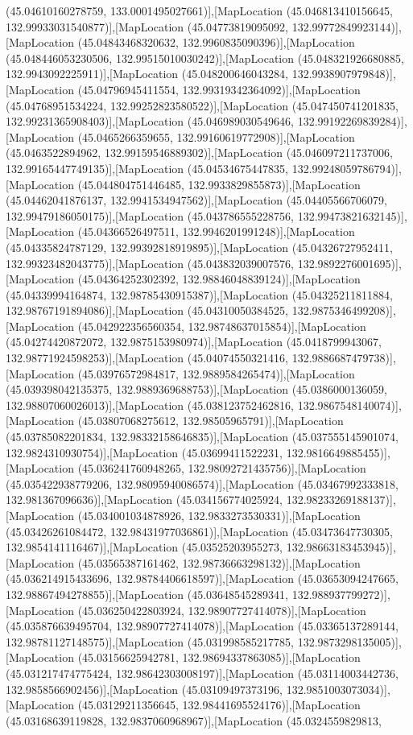 (45.04610160278759, 133.0001495027661)],[MapLocation (45.046813410156645, 132.99933031540877)],[MapLocation (45.04773819095092, 132.99772849923144)],[MapLocation (45.04843468320632, 132.9960835090396)],[MapLocation (45.048446053230506, 132.99515010030242)],[MapLocation (45.048321926680885, 132.9943092225911)],[MapLocation (45.048200646043284, 132.9938907979848)],[MapLocation (45.04796945411554, 132.99319342364092)],[MapLocation (45.04768951534224, 132.99252823580522)],[MapLocation (45.047450741201835, 132.99231365908403)],[MapLocation (45.046989030549646, 132.99192269839284)],[MapLocation (45.0465266359655, 132.99160619772908)],[MapLocation (45.0463522894962, 132.99159546889302)],[MapLocation (45.046097211737006, 132.99165447749135)],[MapLocation (45.04534675447835, 132.99248059786794)],[MapLocation (45.044804751446485, 132.9933829855873)],[MapLocation (45.04462041876137, 132.9941534947562)],[MapLocation (45.04405566706079, 132.99479186050175)],[MapLocation (45.043786555228756, 132.99473821632145)],[MapLocation (45.04366526497511, 132.9946201991248)],[MapLocation (45.04335824787129, 132.99392818919895)],[MapLocation (45.04326727952411, 132.99323482043775)],[MapLocation (45.043832039007576, 132.9892276001695)],[MapLocation (45.04364252302392, 132.98846048839124)],[MapLocation (45.04339994164874, 132.98785430915387)],[MapLocation (45.04325211811884, 132.98767191894086)],[MapLocation (45.04310050384525, 132.9875346499208)],[MapLocation (45.042922356560354, 132.98748637015854)],[MapLocation (45.04274420872072, 132.9875153980974)],[MapLocation (45.0418799943067, 132.98771924598253)],[MapLocation (45.04074550321416, 132.9886687479738)],[MapLocation (45.03976572984817, 132.9889584265474)],[MapLocation (45.039398042135375, 132.9889369688753)],[MapLocation (45.0386000136059, 132.98807060026013)],[MapLocation (45.038123752462816, 132.9867548140074)],[MapLocation (45.03807068275612, 132.98505965791)],[MapLocation (45.03785082201834, 132.98332158646835)],[MapLocation (45.037555145901074, 132.9824310930754)],[MapLocation (45.03699411522231, 132.9816649885455)],[MapLocation (45.036241760948265, 132.98092721435756)],[MapLocation (45.035422938779206, 132.98095940086574)],[MapLocation (45.03467992333818, 132.981367096636)],[MapLocation (45.034156774025924, 132.98233269188137)],[MapLocation (45.034001034878926, 132.9833273530331)],[MapLocation (45.03426261084472, 132.98431977036861)],[MapLocation (45.03473647730305, 132.9854141116467)],[MapLocation (45.03525203955273, 132.98663183453945)],[MapLocation (45.03565387161462, 132.98736663298132)],[MapLocation (45.036214915433696, 132.98784406618597)],[MapLocation (45.03653094247665, 132.98867494278855)],[MapLocation (45.03648545289341, 132.988937799272)],[MapLocation (45.036250422803924, 132.98907727414078)],[MapLocation (45.035876639495704, 132.98907727414078)],[MapLocation (45.03365137289144, 132.98781127148575)],[MapLocation (45.031998585217785, 132.9873298135005)],[MapLocation (45.03156625942781, 132.98694337863085)],[MapLocation (45.031217474775424, 132.98642303008197)],[MapLocation (45.03114003442736, 132.9858566902456)],[MapLocation (45.03109497373196, 132.9851003073034)],[MapLocation (45.03129211356645, 132.98441695524176)],[MapLocation (45.03168639119828, 132.9837060968967)],[MapLocation (45.0324559829813, 
